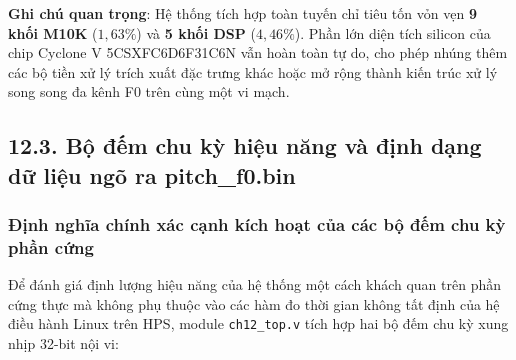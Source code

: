 \textbf{Ghi chú quan trọng}: Hệ thống tích hợp toàn tuyến chỉ tiêu tốn vỏn vẹn \textbf{9 khối M10K} ($1{,}63\%$) và \textbf{5 khối DSP} ($4{,}46\%$). Phần lớn diện tích silicon của chip Cyclone V 5CSXFC6D6F31C6N vẫn hoàn toàn tự do, cho phép nhúng thêm các bộ tiền xử lý trích xuất đặc trưng khác hoặc mở rộng thành kiến trúc xử lý song song đa kênh F0 trên cùng một vi mạch.

\subsection*{12.3. Bộ đếm chu kỳ hiệu năng và định dạng dữ liệu ngõ ra pitch\_f0.bin}

\subsubsection*{Định nghĩa chính xác cạnh kích hoạt của các bộ đếm chu kỳ phần cứng}
Để đánh giá định lượng hiệu năng của hệ thống một cách khách quan trên phần cứng thực mà không phụ thuộc vào các hàm đo thời gian không tất định của hệ điều hành Linux trên HPS, module \texttt{ch12\_top.v} tích hợp hai bộ đếm chu kỳ xung nhịp 32-bit nội vi:


